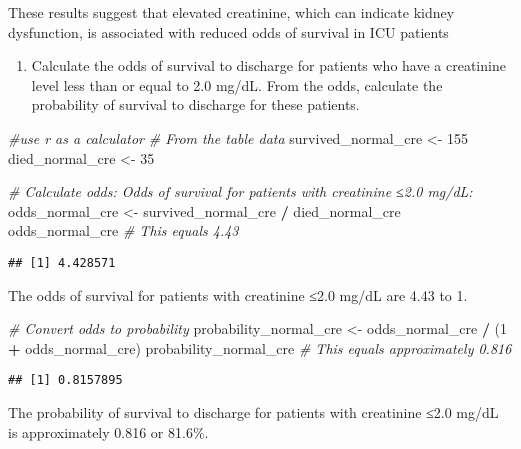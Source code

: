 \documentclass[
]{article}
\newenvironment{Shaded}{\begin{snugshade}}{\end{snugshade}}
\newcommand{\CommentTok}[1]{\textcolor[rgb]{0.56,0.35,0.01}{\textit{#1}}}
\newcommand{\DecValTok}[1]{\textcolor[rgb]{0.00,0.00,0.81}{#1}}
\newcommand{\NormalTok}[1]{#1}
\newcommand{\OtherTok}[1]{\textcolor[rgb]{0.56,0.35,0.01}{#1}}
\newcommand{\SpecialCharTok}[1]{\textcolor[rgb]{0.81,0.36,0.00}{\textbf{#1}}}
\providecommand{\tightlist}{%
  \setlength{\itemsep}{0pt}\setlength{\parskip}{0pt}}
\begin{document}
These results suggest that elevated creatinine, which can indicate
kidney dysfunction, is associated with reduced odds of survival in ICU
patients

\begin{enumerate}
\def\labelenumi{\alph{enumi})}
\tightlist
\item
  Calculate the odds of survival to discharge for patients who have a
  creatinine level less than or equal to 2.0 mg/dL. From the odds,
  calculate the probability of survival to discharge for these patients.
\end{enumerate}

\begin{Shaded}
\begin{Highlighting}[]
\CommentTok{\#use r as a calculator}
\CommentTok{\# From the table data}
\NormalTok{survived\_normal\_cre }\OtherTok{\textless{}{-}} \DecValTok{155}
\NormalTok{died\_normal\_cre }\OtherTok{\textless{}{-}} \DecValTok{35}

\CommentTok{\# Calculate odds:  Odds of survival for patients with creatinine ≤2.0 mg/dL:}
\NormalTok{odds\_normal\_cre }\OtherTok{\textless{}{-}}\NormalTok{ survived\_normal\_cre }\SpecialCharTok{/}\NormalTok{ died\_normal\_cre}
\NormalTok{odds\_normal\_cre  }\CommentTok{\# This equals 4.43}
\end{Highlighting}
\end{Shaded}

\begin{verbatim}
## [1] 4.428571
\end{verbatim}

The odds of survival for patients with creatinine ≤2.0 mg/dL are 4.43 to
1.

\begin{Shaded}
\begin{Highlighting}[]
\CommentTok{\# Convert odds to probability}
\NormalTok{probability\_normal\_cre }\OtherTok{\textless{}{-}}\NormalTok{ odds\_normal\_cre }\SpecialCharTok{/}\NormalTok{ (}\DecValTok{1} \SpecialCharTok{+}\NormalTok{ odds\_normal\_cre)}
\NormalTok{probability\_normal\_cre  }\CommentTok{\# This equals approximately 0.816}
\end{Highlighting}
\end{Shaded}

\begin{verbatim}
## [1] 0.8157895
\end{verbatim}

The probability of survival to discharge for patients with creatinine
≤2.0 mg/dL is approximately 0.816 or 81.6\%.
\end{document}
